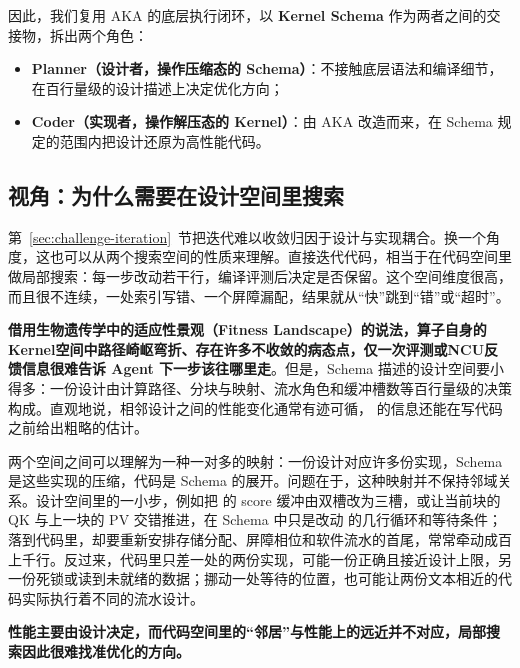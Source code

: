 因此，我们复用 AKA 的底层执行闭环，以 \textbf{Kernel Schema} 作为两者之间的交接物，拆出两个角色：


\begin{itemize}
\item
\textbf{Planner（设计者，操作压缩态的 Schema）}：不接触底层语法和编译细节，在百行量级的设计描述上决定优化方向；


\item
\textbf{Coder（实现者，操作解压态的 Kernel）}：由 AKA 改造而来，在 Schema 规定的范围内把设计还原为高性能代码。


\end{itemize}
\SourceSeparator
\subsection{视角：为什么需要在设计空间里搜索}\label{sec:design-space-search}
第~\ref{sec:challenge-iteration}~节把迭代难以收敛归因于设计与实现耦合。换一个角度，这也可以从两个搜索空间的性质来理解。直接迭代代码，相当于在代码空间里做局部搜索：每一步改动若干行，编译评测后决定是否保留。这个空间维度很高，而且很不连续，一处索引写错、一个屏障漏配，结果就从“快”跳到“错”或“超时”。

\textbf{借用生物遗传学中的适应性景观（Fitness Landscape）的说法，算子自身的Kernel空间中路径崎岖弯折、存在许多不收敛的病态点，仅一次评测或NCU反馈信息很难告诉 Agent 下一步该往哪里走}。但是，Schema 描述的设计空间要小得多：一份设计由计算路径、分块与映射、流水角色和缓冲槽数等百行量级的决策构成。直观地说，相邻设计之间的性能变化通常有迹可循， 的信息还能在写代码之前给出粗略的估计。

两个空间之间可以理解为一种一对多的映射：一份设计对应许多份实现，Schema 是这些实现的压缩，代码是 Schema 的展开。问题在于，这种映射并不保持邻域关系。设计空间里的一小步，例如把  的 score 缓冲由双槽改为三槽，或让当前块的 QK 与上一块的 PV 交错推进，在 Schema 中只是改动  的几行循环和等待条件；落到代码里，却要重新安排存储分配、屏障相位和软件流水的首尾，常常牵动成百上千行。反过来，代码里只差一处的两份实现，可能一份正确且接近设计上限，另一份死锁或读到未就绪的数据；挪动一处等待的位置，也可能让两份文本相近的代码实际执行着不同的流水设计。

\textbf{性能主要由设计决定，而代码空间里的“邻居”与性能上的远近并不对应，局部搜索因此很难找准优化的方向。}


